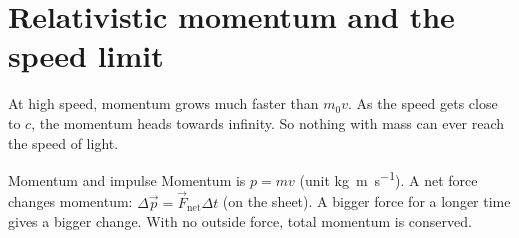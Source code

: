 \section{Relativistic momentum and the speed limit}\label{ch4:sec:momentum}

\begin{bigidea}
At high speed, momentum grows much faster than $m_0v$. As the speed gets close to $c$, the
momentum heads towards infinity. So nothing with mass can ever reach the speed of light.
\end{bigidea}

\begin{keywords}
\end{keywords}

\begin{refresher}{Momentum and impulse}
Momentum is $p = mv$ (unit \si{kg.m.s^{-1}}). A net force changes momentum:
$\Delta\vec{p} = \vec{F}_\mathrm{net}\Delta t$ (on the sheet). A bigger force for a longer time
gives a bigger change. With no outside force, total momentum is conserved.
\end{refresher}

